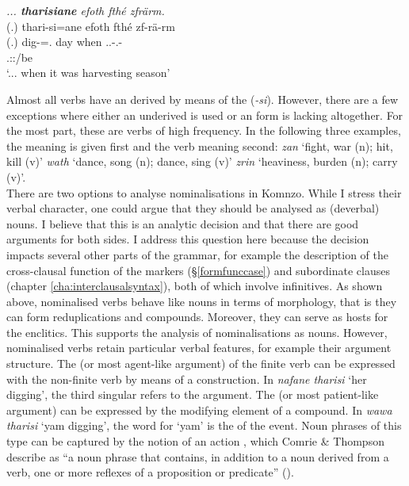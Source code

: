 \begin{exe}
	\ex \textit{... \textbf{tharisiane} efoth fthé zfrärm.}\\
	\glll (.) thari-si=ane efoth fthé zf-rä-rm\\
	(.) dig-\Nmlz{}=\Poss.\Sg{} day when \Tsg.\F.\Betatwo-\Cop.\Ndu-\Dur\\
	{} {} {} {} \footnotesize{\Tsg.\F:\Pst:\Dur/be}\\
	\trans `... when it was harvesting season'
	\label{ex011}
\end{exe}

Almost all verbs have an  derived by means of the  (\emph{-si}). However, there are a few exceptions where either an underived  is used or an  form is lacking altogether. For the most part, these are verbs of high frequency. In the following three examples, the  meaning is given first and the verb meaning second: \emph{zan} `fight, war (n); hit, kill (v)' \emph{wath} `dance, song (n); dance, sing (v)' \emph{zrin} `heaviness, burden (n); carry (v)'.\\

There are two options to analyse nominalisations in Komnzo. While I stress their verbal character, one could argue that they should be analysed as (deverbal) nouns. I believe that this is an analytic decision and that there are good arguments for both sides. I address this question here because the decision impacts several other parts of the grammar, for example the description of the cross-clausal function of the  markers (\S\ref{formfunccase}) and subordinate clauses (chapter \ref{cha:interclausalsyntax}), both of which involve infinitives. As shown above, nominalised verbs behave like nouns in terms of morphology, that is they can form reduplications and  compounds. Moreover, they can serve as hosts for the  enclitics. This supports the analysis of nominalisations as nouns. However, nominalised verbs retain particular verbal features, for example their argument structure. The  (or most agent-like argument) of the finite verb can be expressed with the non-finite verb by means of a  construction. In \emph{nafane tharisi} `her digging', the third singular  refers to the  argument. The  (or most patient-like argument) can be expressed by the modifying element of a  compound. In \emph{wawa tharisi} `yam digging', the word for `yam' is the  of the event. Noun phrases of this type can be captured by the notion of an action , which Comrie \& Thompson describe as ``a noun phrase that contains, in addition to a noun derived from a verb, one or more reflexes of a proposition or predicate'' (\citeyear[343]{Comrie:2007nom}).\\

